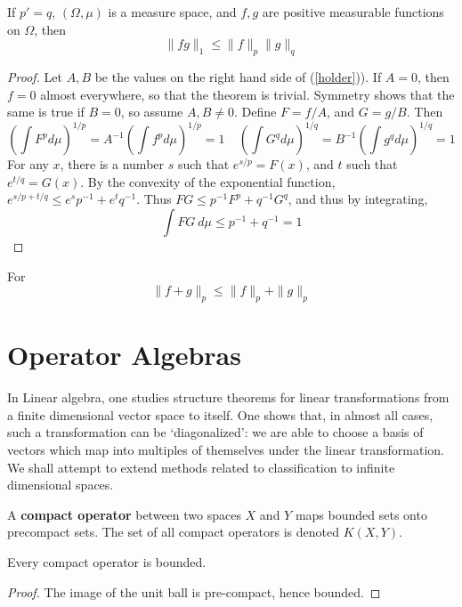 \begin{theorem}[H\"{o}lder]
    If $p' = q$, $(\Omega,\mu)$ is a measure space, and $f,g$ are positive measurable functions on $\Omega$, then
    \begin{equation} \label{holder} \| fg \|_1 \leq \| f \|_p \| g \|_q \end{equation}
\end{theorem}
\begin{proof}
    Let $A,B$ be the values on the right hand side of (\ref{holder})). If $A = 0$, then $f = 0$ almost everywhere, so that the theorem is trivial. Symmetry shows that the same is true if $B = 0$, so assume $A, B \neq 0$. Define $F = f/A$, and $G = g/B$. Then
    \[ \left( \int F^p d\mu \right)^{1/p} = A^{-1} \left( \int f^p d\mu \right)^{1/p} = 1\ \ \ \ \ \left( \int G^q d\mu \right)^{1/q} = B^{-1} \left( \int g^q d\mu \right)^{1/q} = 1 \]
    For any $x$, there is a number $s$ such that $e^{s/p} = F(x)$, and $t$ such that $e^{t/q} = G(x)$. By the convexity of the exponential function, $e^{s/p + t/q} \leq e^s p^{-1} + e^t q^{-1}$. Thus $FG \leq p^{-1} F^p + q^{-1} G^q$, and thus by integrating,
    \[ \int FG\ d\mu \leq p^{-1} + q^{-1} = 1 \]
\end{proof}

\begin{corollary}[Minkowski]
    For
    \[ \| f + g \|_p \leq \| f \|_p + \| g \|_p \]
\end{corollary}




\chapter{Operator Algebras}

In Linear algebra, one studies structure theorems for linear transformations from a finite dimensional vector space to itself. One shows that, in almost all cases, such a transformation can be `diagonalized': we are able to choose a basis of vectors which map into multiples of themselves under the linear transformation. We shall attempt to extend methods related to classification to infinite dimensional spaces.

\begin{definition}
    A {\bf compact operator} between two spaces $X$ and $Y$ maps bounded sets onto precompact sets. The set of all compact operators is denoted $K(X,Y)$.
\end{definition}

\begin{lemma}
    Every compact operator is bounded.
\end{lemma}
\begin{proof}
    The image of the unit ball is pre-compact, hence bounded.
\end{proof}

